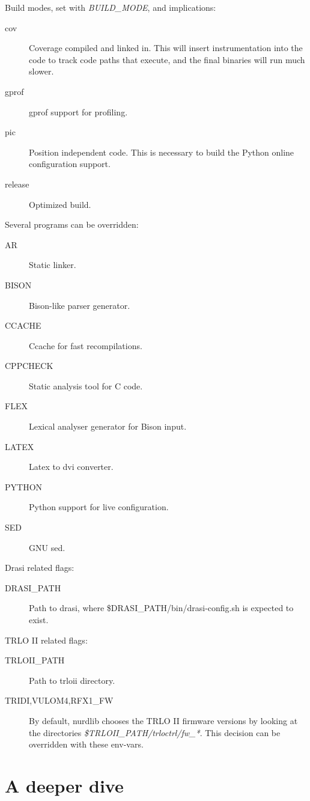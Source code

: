 \documentclass{article}
\begin{document}
Build modes, set with \emph{BUILD\_MODE}, and implications:
\begin{description}
\item[cov] Coverage compiled and linked in. This will insert instrumentation
into the code to track code paths that execute, and the final binaries will
run much slower.
\item[gprof] gprof support for profiling.
\item[pic] Position independent code. This is necessary to build the Python
online configuration support.
\item[release] Optimized build.
\end{description}

Several programs can be overridden:
\begin{description}
\item[AR] Static linker.
\item[BISON] Bison-like parser generator.
\item[CCACHE] Ccache for fast recompilations.
\item[CPPCHECK] Static analysis tool for C code.
\item[FLEX] Lexical analyser generator for Bison input.
\item[LATEX] Latex to dvi converter.
\item[PYTHON] Python support for live configuration.
\item[SED] GNU sed.
\end{description}

Drasi related flags:
\begin{description}
\item[DRASI\_PATH] Path to drasi, where \$DRASI\_PATH/bin/drasi-config.sh is
expected to exist.
\end{description}

TRLO II related flags:
\begin{description}
\item[TRLOII\_PATH] Path to trloii directory.
\item[{TRIDI,VULOM4,RFX1}\_FW] By default, nurdlib chooses the TRLO II
firmware versions by looking at the directories
\emph{\$TRLOII\_PATH/trloctrl/fw\_*}. This decision can be overridden with
these env-vars.
\end{description}



\section{A deeper dive}
\end{document}
